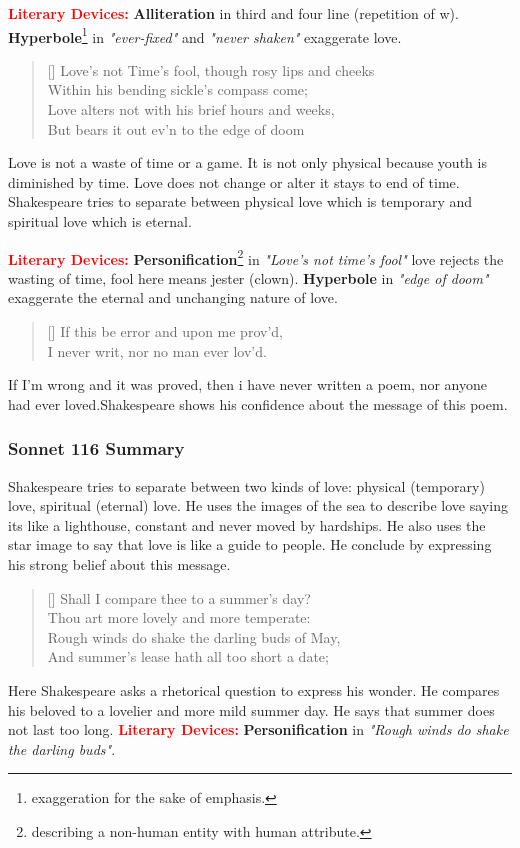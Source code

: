 \documentclass[12pt, a4paper]{article}
\begin{document}
\textbf{\textcolor{red}{Literary Devices:}} \textbf{Alliteration} in third and
four line (repetition of w). \textbf{Hyperbole}\footnote{exaggeration for the sake of emphasis.}
in \textit{"ever-fixed"} and \textit{"never shaken"} 
exaggerate love.

\begin{verse}[\versewidth]
{\fontverse
Love's not Time's fool, though rosy lips and cheeks\\
Within his bending sickle's compass come; \\
Love alters not with his brief hours and weeks,\\
But bears it out ev'n to the edge of doom
}
\end{verse}
Love is not a waste of time or a game. It is not only physical
because youth is diminished by time. Love does not change or alter
it stays to end of time. Shakespeare tries to separate between physical
love which is temporary and spiritual love which is eternal.\medbreak

\textbf{\textcolor{red}{Literary Devices:}} \textbf{Personification}\footnote{
describing a non-human entity with human attribute.} 
in \textit{"Love's not time's fool"} love rejects the wasting of time, fool here means 
jester (clown). \textbf{Hyperbole} in \textit{"edge of doom"} 
exaggerate the eternal and unchanging nature of love.

\begin{verse}[\versewidth]
{\fontverse
If this be error and upon me prov'd,\\
I never writ, nor no man ever lov'd.
}
\end{verse}
If I'm wrong and it was proved, then i have 
never written a poem, nor anyone had ever loved.Shakespeare shows his 
confidence about the message of this poem.

\subsubsection*{Sonnet 116 Summary}
Shakespeare tries to separate between two kinds of love:
physical (temporary) love, spiritual
(eternal) love. He uses the images of the sea to describe love
saying its like a lighthouse, constant and never moved by hardships.
He also uses the star image to say that love is like a guide to people.
He conclude by expressing his strong belief about this message.

\settowidth{\versewidth}{Shall I compare thee to a summer’s day?}
\begin{verse}[\versewidth]
{\fontverse
Shall I compare thee to a summer’s day?\\
Thou art more lovely and more temperate: \\
Rough winds do shake the darling buds of May, \\
And summer’s lease hath all too short a date; 
}
\end{verse}
Here Shakespeare asks a rhetorical question to 
express his wonder. He compares his beloved to a lovelier and
more mild summer day. He says that summer does not last too long.\medbreak
\textbf{\textcolor{red}{Literary Devices:}} \textbf{Personification} in \textit{"Rough winds do shake the darling buds"}.
\end{document}
